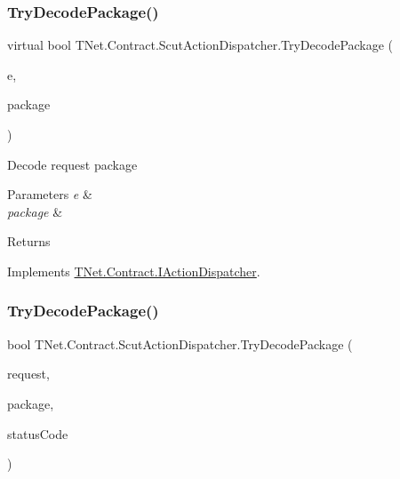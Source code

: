 \subsubsection{\texorpdfstring{Try\+Decode\+Package()}{TryDecodePackage()}\hspace{0.1cm}{\footnotesize\ttfamily [1/4]}}
{\footnotesize\ttfamily virtual bool T\+Net.\+Contract.\+Scut\+Action\+Dispatcher.\+Try\+Decode\+Package (\begin{DoxyParamCaption}\item[{Connection\+Event\+Args}]{e,  }\item[{out \mbox{\hyperlink{class_t_net_1_1_contract_1_1_request_package}{Request\+Package}}}]{package }\end{DoxyParamCaption})\hspace{0.3cm}{\ttfamily [virtual]}}



Decode request package 


\begin{DoxyParams}{Parameters}
{\em e} & \\
\hline
{\em package} & \\
\hline
\end{DoxyParams}
\begin{DoxyReturn}{Returns}

\end{DoxyReturn}


Implements \mbox{\hyperlink{interface_t_net_1_1_contract_1_1_i_action_dispatcher_a6cd207fe8c2c4c6af269c24cf7a12f43}{T\+Net.\+Contract.\+I\+Action\+Dispatcher}}.

\mbox{\label{class_t_net_1_1_contract_1_1_scut_action_dispatcher_aad510a5ad8c140c45b6d992903fed081}} 
\subsubsection{\texorpdfstring{Try\+Decode\+Package()}{TryDecodePackage()}\hspace{0.1cm}{\footnotesize\ttfamily [2/4]}}
{\footnotesize\ttfamily bool T\+Net.\+Contract.\+Scut\+Action\+Dispatcher.\+Try\+Decode\+Package (\begin{DoxyParamCaption}\item[{Http\+Listener\+Request}]{request,  }\item[{out \mbox{\hyperlink{class_t_net_1_1_contract_1_1_request_package}{Request\+Package}}}]{package,  }\item[{out int}]{status\+Code }\end{DoxyParamCaption})}






